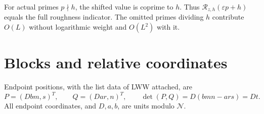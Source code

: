 \documentclass[11pt]{article}
\theoremstyle{definition}
\newcommand{\GN}{\mathcal N}
\theoremstyle{remark}
\numberwithin{equation}{section}
\begin{document}
For actual primes $p\nmid h$, the shifted value is coprime to $h$. Thus $\mathcal R_{z,h}(\varepsilon p+h)$ equals the full roughness indicator. The omitted primes dividing $h$ contribute $O(L)$ without logarithmic weight and $O(L^2)$ with it.

\section{Blocks and relative coordinates}\label{sec:blocks}
Endpoint positions, with the list data of LWW attached, are
\begin{equation}\label{eq:positions}
 P=(Dbm,s)^T,\qquad Q=(Dar,n)^T,\qquad
 \det(P,Q)=D(bmn-ars)=Dt.
\end{equation}
All endpoint coordinates, and $D,a,b$, are units modulo $\GN$.
\end{document}
